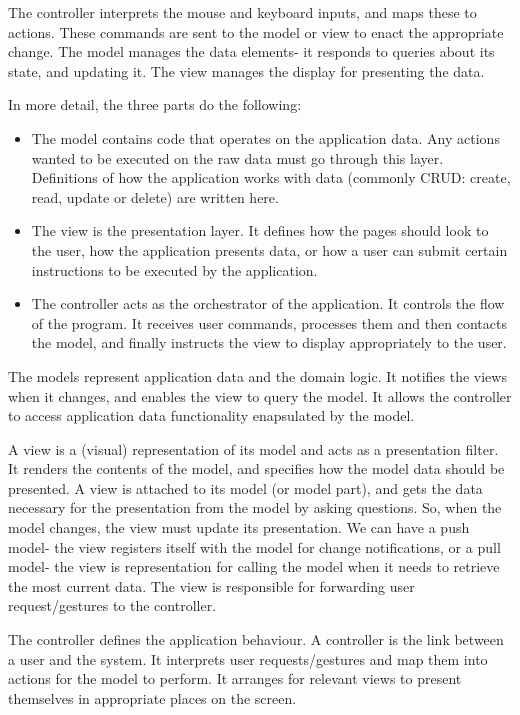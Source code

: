 \documentclass[a4paper, openany]{memoir}
\begin{document}
The controller interprets the mouse and keyboard inputs, and maps these to actions. These commands are sent to the model or view to enact the appropriate change. The model manages the data elements- it responds to queries about its state, and updating it. The view manages the display for presenting the data.

In more detail, the three parts do the following:
\begin{itemize}
    \item The model contains code that operates on the application data. Any actions wanted to be executed on the raw data must go through this layer. Definitions of how the application works with data (commonly CRUD: create, read, update or delete) are written here.
    \item The view is the presentation layer. It defines how the pages should look to the user, how the application presents data, or how a user can submit certain instructions to be executed by the application.
    \item The controller acts as the orchestrator of the application. It controls the flow of the program. It receives user commands, processes them and then contacts the model, and finally instructs the view to display appropriately to the user.
\end{itemize}
The models represent application data and the domain logic. It notifies the views when it changes, and enables the view to query the model. It allows the controller to access application data functionality enapsulated by the model.

A view is a (visual) representation of its model and acts as a presentation filter. It renders the contents of the model, and specifies how the model data should be presented. A view is attached to its model (or model part), and gets the data necessary for the presentation from the model by asking questions. So, when the model changes, the view must update its presentation. We can have a push model- the view registers itself with the model for change notifications, or a pull model- the view is representation for calling the model when it needs to retrieve the most current data. The view is responsible for forwarding user request/gestures to the controller.

The controller defines the application behaviour. A controller is the link between a user and the system. It interprets user requests/gestures and map them into actions for the model to perform. It arranges for relevant views to present themselves in appropriate places on the screen.
\end{document}
